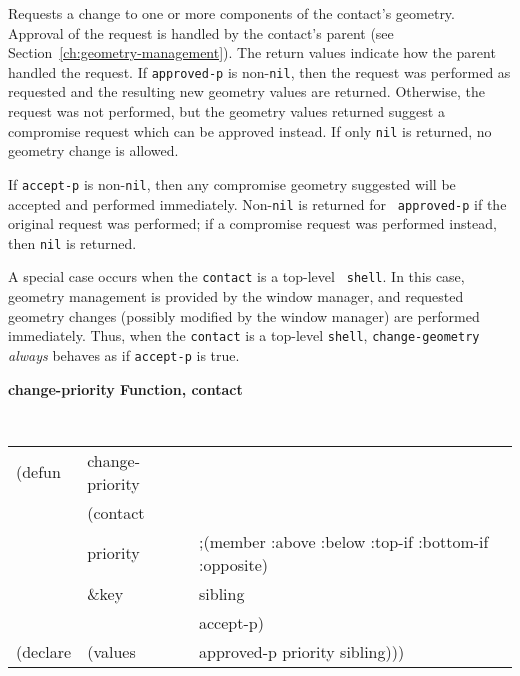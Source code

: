 \begin{flushright}\parbox[t]{6.125in}{
Requests a change to one or more components of the contact's geometry.
Approval of the request is handled by the contact's parent (see
Section~\ref{ch:geometry-management}).
The return values indicate how the parent handled the 
request. If {\tt approved-p} is non-{\tt nil}, then the request was performed as
requested and
the resulting new geometry values are returned.  Otherwise, the request was not
performed, but the geometry
values returned suggest a compromise request which can be approved instead.
If only {\tt nil} is returned, no geometry change is allowed.
}\end{flushright}

\begin{flushright}\parbox[t]{6.125in}{
If {\tt accept-p} is non-{\tt nil}, then any compromise geometry suggested will be
accepted and performed immediately. Non-{\tt nil} is returned for {\tt
approved-p} if the original request was performed; if a compromise request was
performed instead, then {\tt nil} is returned.
}\end{flushright}

\begin{flushright}\parbox[t]{6.125in}{ 
A special case occurs when the {\tt contact} is a top-level {\tt
shell}. In this case, geometry management
is provided by the window manager, and requested geometry
changes (possibly modified by the window manager) are performed immediately.
Thus, when the {\tt contact} is a top-level {\tt shell}, {\tt change-geometry}
{\em always} behaves as if {\tt accept-p} is true.
}\end{flushright}



{\samepage
{\large {\bf change-priority \hfill Function, contact}}
\begin{flushright}
\parbox[t]{6.125in}{
\tt
\begin{tabular}{lll}
\raggedright
(defun & change-priority & \\
& (contact\\
&  priority & ;(member :above :below :top-if :bottom-if :opposite)\\
& \&key & sibling\\
& & accept-p) \\
(declare &(values &approved-p priority sibling)))
\end{tabular}
\rm}
\end{flushright}}

